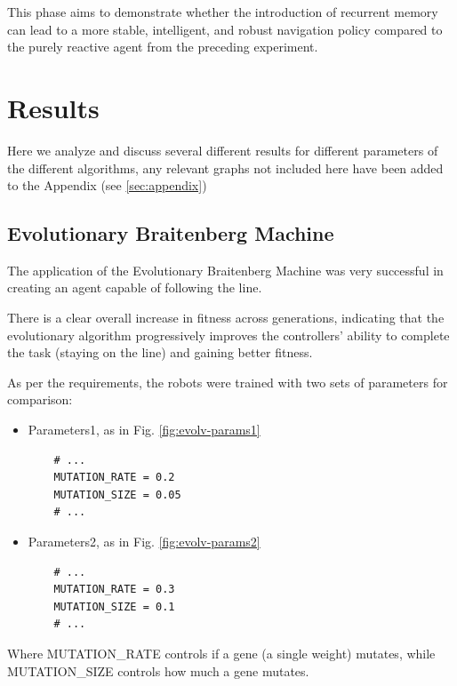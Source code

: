 \documentclass[final,5p,times,twocolumn,authoryear]{elsarticle}
\begin{document}
This phase aims to demonstrate whether the introduction of recurrent memory can lead to a more stable, intelligent, and robust navigation policy compared to the purely reactive agent from the preceding experiment.





\section{Results}

Here we analyze and discuss several different results for different parameters of the different algorithms, any relevant graphs not included here have been added to the Appendix (see \ref{sec:appendix})

\subsection{Evolutionary Braitenberg Machine}

The application of the Evolutionary Braitenberg Machine was very successful in creating an agent capable of following the line. 

There is a clear overall increase in fitness across generations, indicating that the evolutionary algorithm progressively improves the controllers' ability to complete the task (staying on the line) and gaining better fitness.

As per the requirements, the robots were trained with two sets of parameters for comparison:

\begin{itemize}
    \item Parameters1, as in Fig. \ref{fig:evolv-params1}
    \begin{verbatim}
    # ...
    MUTATION_RATE = 0.2
    MUTATION_SIZE = 0.05
    # ...
    \end{verbatim}
    
    \item Parameters2, as in Fig. \ref{fig:evolv-params2}
    \begin{verbatim}
    # ...
    MUTATION_RATE = 0.3
    MUTATION_SIZE = 0.1
    # ...
    \end{verbatim}
\end{itemize}

Where MUTATION\_RATE controls if a gene (a single weight) mutates, while MUTATION\_SIZE controls how much a gene mutates.

\end{document}
